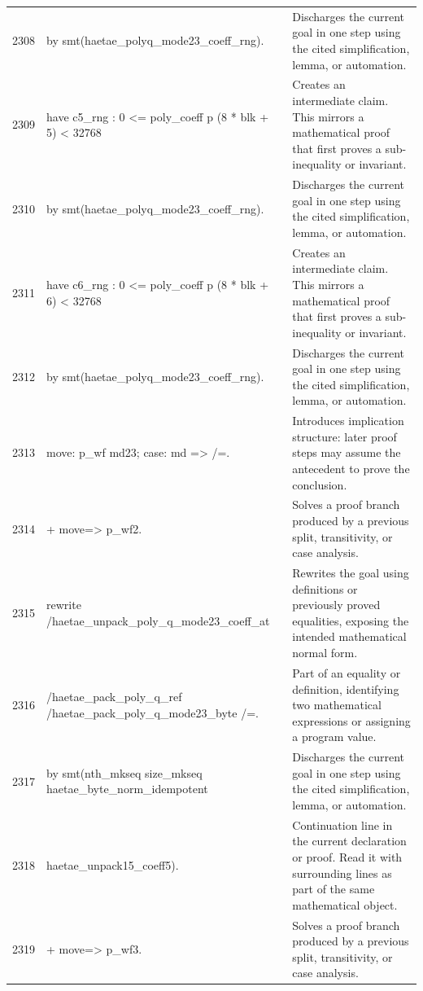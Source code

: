 \documentclass[10pt]{article}
\begin{document}
\begin{longtable}{r L{0.53\textwidth} L{0.37\textwidth}}
2308 & {\ttfamily\scriptsize   by smt(haetae\_polyq\_mode23\_coeff\_rng).} & Discharges the current goal in one step using the cited simplification, lemma, or automation. \\
2309 & {\ttfamily\scriptsize have c5\_rng : 0 <= poly\_coeff p (8 * blk + 5) < 32768} & Creates an intermediate claim.  This mirrors a mathematical proof that first proves a sub-inequality or invariant. \\
2310 & {\ttfamily\scriptsize   by smt(haetae\_polyq\_mode23\_coeff\_rng).} & Discharges the current goal in one step using the cited simplification, lemma, or automation. \\
2311 & {\ttfamily\scriptsize have c6\_rng : 0 <= poly\_coeff p (8 * blk + 6) < 32768} & Creates an intermediate claim.  This mirrors a mathematical proof that first proves a sub-inequality or invariant. \\
2312 & {\ttfamily\scriptsize   by smt(haetae\_polyq\_mode23\_coeff\_rng).} & Discharges the current goal in one step using the cited simplification, lemma, or automation. \\
2313 & {\ttfamily\scriptsize move: p\_wf md23; case: md => /=.} & Introduces implication structure: later proof steps may assume the antecedent to prove the conclusion. \\
2314 & {\ttfamily\scriptsize + move=> p\_wf2.} & Solves a proof branch produced by a previous split, transitivity, or case analysis. \\
2315 & {\ttfamily\scriptsize   rewrite /haetae\_unpack\_poly\_q\_mode23\_coeff\_at} & Rewrites the goal using definitions or previously proved equalities, exposing the intended mathematical normal form. \\
2316 & {\ttfamily\scriptsize           /haetae\_pack\_poly\_q\_ref /haetae\_pack\_poly\_q\_mode23\_byte /=.} & Part of an equality or definition, identifying two mathematical expressions or assigning a program value. \\
2317 & {\ttfamily\scriptsize   by smt(nth\_mkseq size\_mkseq haetae\_byte\_norm\_idempotent} & Discharges the current goal in one step using the cited simplification, lemma, or automation. \\
2318 & {\ttfamily\scriptsize          haetae\_unpack15\_coeff5).} & Continuation line in the current declaration or proof.  Read it with surrounding lines as part of the same mathematical object. \\
2319 & {\ttfamily\scriptsize + move=> p\_wf3.} & Solves a proof branch produced by a previous split, transitivity, or case analysis. \\

\end{longtable}
\end{document}

